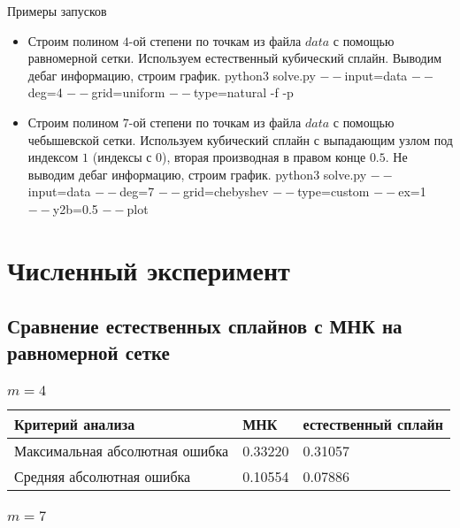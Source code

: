 \documentclass[paper=a4, fontsize=11pt]{scrartcl} %
\numberwithin{equation}{section} %
\numberwithin{figure}{section} %
\numberwithin{table}{section} %
\begin{document}
Примеры запусков

\begin{itemize}

	\item Строим полином $4$-ой степени по точкам из файла $data$ с помощью равномерной сетки. Используем естественный кубический сплайн. Выводим дебаг информацию, строим график.
	\subitem python3 solve.py $--$input=data $--$deg=4 $--$grid=uniform $--$type=natural -f -p 
    
    \item Строим полином $7$-ой степени по точкам из файла $data$ с помощью чебышевской сетки. Используем кубический сплайн с выпадающим узлом под индексом $1$ (индексы с $0$), вторая производная в правом конце $0.5$. Не выводим дебаг информацию, строим график.
    \subitem python3 solve.py $--$input=data $--$deg=7 $--$grid=chebyshev $--$type=custom $--$ex=1 $--$y2b=0.5 $--$plot
   
\end{itemize}


\section{Численный эксперимент}

\subsection{Сравнение естественных сплайнов с МНК на равномерной сетке}

\subsubsection{$m=4$}

\begin{tabular}{|p{4 cm}|p{4 cm}|p{4 cm}|}
\hline
	Критерий анализа & МНК & естественный сплайн \\
\hline 
	Максимальная абсолютная ошибка & 0.33220 & 0.31057 \\
\hline 
	Средняя абсолютная ошибка & 0.10554 &  0.07886 \\
\hline
\end{tabular}

\subsubsection{$m=7$}
\end{document}
